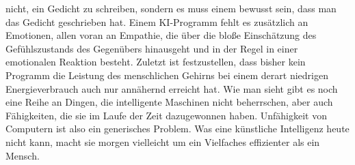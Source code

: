 nicht, ein Gedicht zu schreiben, sondern es muss einem bewusst sein, dass man das Gedicht geschrieben hat.
Einem KI-Programm fehlt es zusätzlich an Emotionen, allen voran an Empathie, die über die bloße Einschätzung des Gefühlszustands des Gegenübers hinausgeht und in der Regel in einer emotionalen Reaktion besteht.
Zuletzt ist festzustellen, dass bisher kein Programm die Leistung des menschlichen Gehirns bei einem derart niedrigen Energieverbrauch auch nur annähernd erreicht hat.
Wie man sieht gibt es noch eine Reihe an Dingen, die intelligente Maschinen nicht beherrschen, aber auch Fähigkeiten, die sie im Laufe der Zeit dazugewonnen haben.
Unfähigkeit von Computern ist also ein generisches Problem.
Was eine künstliche Intelligenz heute nicht kann, macht sie morgen vielleicht um ein Vielfaches effizienter als ein Mensch.

